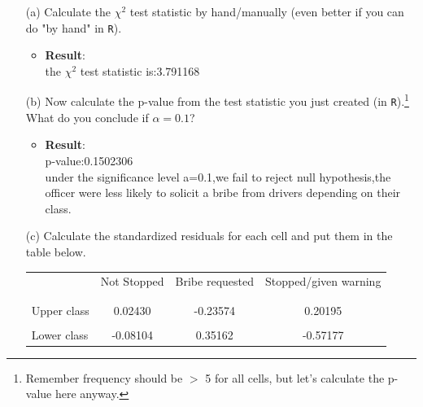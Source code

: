\documentclass[12pt,letterpaper]{article}
\begin{document}
\begin{enumerate}
	
	\item [(a)]
	Calculate the $\chi^2$ test statistic by hand/manually (even better if you can do "by hand" in \texttt{R}).\\
	
    \begin{itemize}
    \item \textbf{Result}:\\
    the $\chi^2$ test statistic is:3.791168
    \end{itemize}

	
	\item [(b)]
	Now calculate the p-value from the test statistic you just created (in \texttt{R}).\footnote{Remember frequency should be $>$ 5 for all cells, but let's calculate the p-value here anyway.}  What do you conclude if $\alpha = 0.1$?\\
		
	\begin{itemize}
		\item \textbf{Result}:\\
		p-value:0.1502306\\
		under the significance level a=0.1,we fail to reject null hypothesis,the officer were less likely to solicit a bribe from drivers depending on their class.
	\end{itemize}
	
	\item [(c)] Calculate the standardized residuals for each cell and put them in the table below.
	\vspace{1cm}
		
	\begin{table}[h]
		\centering
		\begin{tabular}{l | c c c }
			& Not Stopped & Bribe requested & Stopped/given warning \\
			\\[-1.8ex] 
			\hline \\[-1.8ex]
			Upper class  & 0.02430 &-0.23574 &  0.20195 \\
			\\
			Lower class &-0.08104 &0.35162 & -0.57177  \\
			
		\end{tabular}
	\end{table}
	

\end{enumerate}
\end{document}
